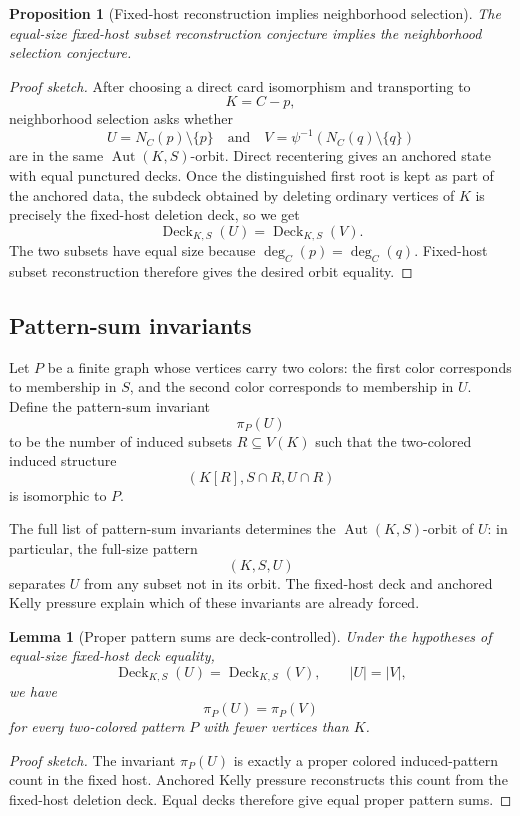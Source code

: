 \documentclass[11pt]{article}
\newtheorem{lemma}{Lemma}
\newtheorem{proposition}{Proposition}
\newcommand{\Deck}{\operatorname{Deck}}
\newcommand{\Aut}{\operatorname{Aut}}
\begin{document}
\begin{proposition}[Fixed-host reconstruction implies neighborhood selection]
The equal-size fixed-host subset reconstruction conjecture implies the
neighborhood selection conjecture.
\end{proposition}

\begin{proof}[Proof sketch]
After choosing a direct card isomorphism and transporting to
\[
  K=C-p,
\]
neighborhood selection asks whether
\[
  U=N_C(p)\setminus\{p\}
  \quad\text{and}\quad
  V=\psi^{-1}(N_C(q)\setminus\{q\})
\]
are in the same \(\Aut(K,S)\)-orbit.  Direct recentering gives an anchored
state with equal punctured decks.  Once the distinguished first root is kept
as part of the anchored data, the subdeck obtained by deleting ordinary
vertices of \(K\) is precisely the fixed-host deletion deck, so we get
\[
  \Deck_{K,S}(U)=\Deck_{K,S}(V).
\]
The two subsets have equal size because \(\deg_C(p)=\deg_C(q)\).  Fixed-host
subset reconstruction therefore gives the desired orbit equality.
\end{proof}

\subsection{Pattern-sum invariants}

Let \(P\) be a finite graph whose vertices carry two colors: the first color
corresponds to membership in \(S\), and the second color corresponds to
membership in \(U\).  Define the pattern-sum invariant
\[
  \pi_P(U)
\]
to be the number of induced subsets \(R\subseteq V(K)\) such that the
two-colored induced structure
\[
  (K[R],S\cap R,U\cap R)
\]
is isomorphic to \(P\).

The full list of pattern-sum invariants determines the
\(\Aut(K,S)\)-orbit of \(U\): in particular, the full-size pattern
\[
  (K,S,U)
\]
separates \(U\) from any subset not in its orbit.  The fixed-host deck and
anchored Kelly pressure explain which of these invariants are already forced.

\begin{lemma}[Proper pattern sums are deck-controlled]
Under the hypotheses of equal-size fixed-host deck equality,
\[
  \Deck_{K,S}(U)=\Deck_{K,S}(V),
  \qquad
  |U|=|V|,
\]
we have
\[
  \pi_P(U)=\pi_P(V)
\]
for every two-colored pattern \(P\) with fewer vertices than \(K\).
\end{lemma}

\begin{proof}[Proof sketch]
The invariant \(\pi_P(U)\) is exactly a proper colored induced-pattern count
in the fixed host.  Anchored Kelly pressure reconstructs this count from the
fixed-host deletion deck.  Equal decks therefore give equal proper pattern
sums.
\end{proof}
\end{document}
